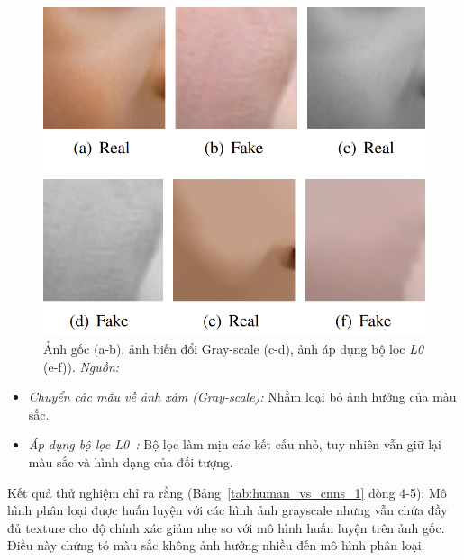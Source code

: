 %
%
\begin{figure}[h]
	\centering
	\includegraphics[width=0.8\linewidth]{Images/gray-scale-and-texture-1.png}
	\begin{minipage}{0.9\linewidth}
		\caption{Ảnh gốc (a-b), ảnh biến đổi Gray-scale (c-d), ảnh áp dụng bộ lọc \textit{L0} (e-f)). \textit{Nguồn: \cite{9157447}}}
		\label{fig:gray-scale-and-texture-1}
	\end{minipage}
\end{figure}
%
%
\begin{itemize}
	\item \textit{Chuyển các mẫu về ảnh xám (Gray-scale):} Nhằm loại bỏ ảnh hưởng của màu sắc.
	\item \textit{Áp dụng bộ lọc L0~\cite{10.1145/2070781.2024208}:} Bộ lọc làm mịn các kết cấu nhỏ, tuy nhiên vẫn giữ lại màu sắc và hình dạng của đối tượng.
\end{itemize}
%
%
Kết quả thử nghiệm chỉ ra rằng (Bảng~\ref{tab:human_vs_cnns_1} dòng 4-5): Mô hình phân loại được huấn luyện với các hình ảnh \gls{grayscale} nhưng vẫn chứa đầy đủ \gls{texture} cho độ chính xác giảm nhẹ so với mô hình huấn luyện trên ảnh gốc. Điều này chứng tỏ màu sắc không ảnh hưởng nhiều đến mô hình phân loại.

